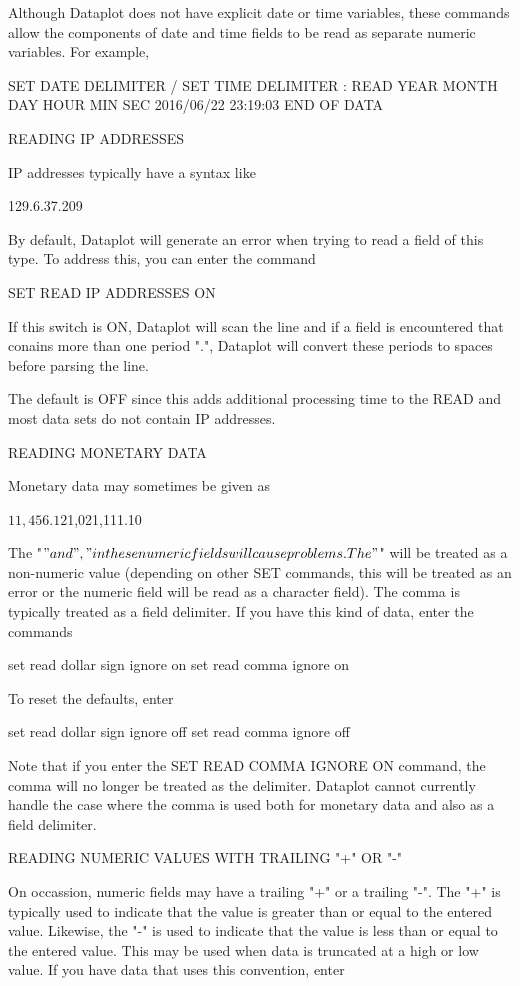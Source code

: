 Although Dataplot does not have explicit date or time variables,
these commands allow the components of date and time fields to
be read as separate numeric variables.  For example,

   SET DATE DELIMITER /
   SET TIME DELIMITER :
   READ YEAR MONTH DAY HOUR MIN SEC
   2016/06/22  23:19:03
   END OF DATA

READING IP ADDRESSES

IP addresses typically have a syntax like

   129.6.37.209

By default, Dataplot will generate an error when trying to read a
field of this type.  To address this, you can enter the command

   SET READ IP ADDRESSES ON

If this switch is ON, Dataplot will scan the line and if a field is
encountered that conains more than one period ".", Dataplot will
convert these periods to spaces before parsing the line.

The default is OFF since this adds additional processing time to
the READ and most data sets do not contain IP addresses.

READING MONETARY DATA

Monetary data may sometimes be given as

   $11,456.12  $1,021,111.10

The "$" and "," in these numeric fields will cause problems.  The
"$" will be treated as a non-numeric value (depending on other
SET commands, this will be treated as an error or the numeric field
will be read as a character field).  The comma is typically treated
as a field delimiter.  If you have this kind of data, enter the
commands

    set read dollar sign ignore on
    set read comma ignore on

To reset the defaults, enter

    set read dollar sign ignore off
    set read comma ignore off

Note that if you enter the SET READ COMMA IGNORE ON command, the
comma will no longer be treated as the delimiter.  Dataplot cannot
currently handle the case where the comma is used both for monetary
data and also as a field delimiter.

READING NUMERIC VALUES WITH TRAILING "+" OR "-"

On occassion, numeric fields may have a trailing "+" or a
trailing "-".  The "+" is typically used to indicate that the
value is greater than or equal to the entered value.  Likewise, the
"-" is used to indicate that the value is less than or equal to the
entered value.  This may be used when data is truncated at a high
or low value.  If you have data that uses this convention, enter

